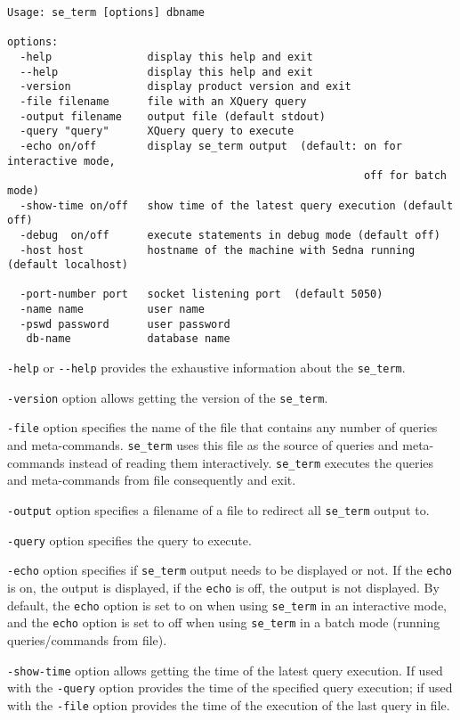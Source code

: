 \documentclass[a4paper,12pt]{article}
\begin{document}
\begin{verbatim}
Usage: se_term [options] dbname

options:
  -help			      display this help and exit
  --help		      display this help and exit
  -version		      display product version and exit
  -file filename	  file with an XQuery query			  
  -output filename	  output file (default stdout)
  -query "query"	  XQuery query to execute		
  -echo on/off		  display se_term output  (default: on for interactive mode,
                                                        off for batch mode)
  -show-time on/off	  show time of the latest query execution (default off)
  -debug  on/off      execute statements in debug mode (default off)
  -host host		  hostname of the machine with Sedna running (default localhost)
		
  -port-number port	  socket listening port  (default 5050)
  -name name		  user name 
  -pswd password	  user password 
   db-name		      database name
\end{verbatim}

\verb!-help! or \verb!--help! provides the exhaustive information about the \verb!se_term!.

\verb!-version! option allows getting the version of the \verb!se_term!.

\verb!-file! option specifies the name of the file that contains any number of queries and meta-commands. \verb!se_term! uses this file as the source of queries and meta-commands instead of reading them interactively. \verb!se_term! executes the queries and meta-commands from file consequently and exit.

\verb!-output! option specifies a filename of a file to redirect all \verb!se_term! output to. 

\verb!-query! option specifies the query to execute.

\verb!-echo! option specifies if \verb!se_term! output needs to be displayed or not. If the \verb!echo! is on, the output is displayed, if the \verb!echo! is off, the output is not displayed. By default, the \verb!echo! option is set to on when using \verb!se_term! in an interactive mode, and the \verb!echo! option is set to off when using \verb!se_term! in a batch mode (running queries/commands from file).

\verb!-show-time! option allows getting the time of the latest query execution. If used with the \verb!-query! option provides the time of the specified query execution; if used with the \verb!-file! option provides the time of the execution of the last query in file.
\end{document}
